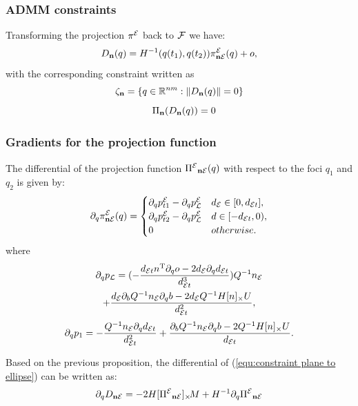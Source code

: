 \documentclass[journal]{IEEEtran}  %
\begin{document}
  \subsubsection{ADMM constraints}
  Transforming the projection $\pi^{\mathcal{E}}$ back to $\mathcal{F}$ we have:
  \begin{equation}\label{equ:constraint plane to ellipse}
    D_{\mathbf{n}}(q)= H^{-1}(q(t_1),q(t_2))\pi^{\mathcal{E}}_{\mathbf{n} \mathcal{E}}(q)+o,
  \end{equation}
  with the corresponding constraint written as
  \begin{equation}
    \zeta_{\mathbf{n}} = \{q\in\mathbb{R}^{nm}:\lVert D_{\mathbf{n}}(q)\rVert = 0 \}
  \end{equation}
  \begin{equation}
   \quad\Pi_{\mathbf{n}}(D_{\mathbf{n}}(q)) = {0}
  \end{equation}

  \subsubsection{Gradients for the projection function}
  \begin{proposition}\label{prop:dpi_ne dt}
    The differential of the projection function ${\Pi^{\mathcal{E}}}_{\mathbf{n} \mathcal{E}}(q)$ with respect to the foci $q_1$ and $q_2$ is given by:
    \begin{equation}
      \partial_q \pi^{\mathcal{E}}_{\mathbf{n} \mathcal{E}}(q) = \begin{cases}
        \partial_q p^{\mathcal{E}}_{t1}-\partial_q p^{\mathcal{E}}_{\mathcal{L}} &  d_{\mathcal{E}} \in [0, d_{\mathcal{E} t}], \\
        \partial_q p^{\mathcal{E}}_{t2}-\partial_q p^{\mathcal{E}}_{\mathcal{L}} &  d \in [- d_{\mathcal{E} t},0), \\
        {0} & otherwise.
      \end{cases}
    \end{equation}
    where
    \begin{multline}
      \partial_q p_{\mathcal{L}} =   (-\frac{d_{\mathcal{E} t} n^\mathrm{T} \partial_q o -2d_{\mathcal{E}} \partial_q d_{\mathcal{E} t}}{d_{\mathcal{E} t}^3} )Q^{-1}n_{\mathcal{E}} \\
      + \frac{d_{\mathcal{E}}\partial_b Q^{-1} n_{\mathcal{E}} \partial_q b -  2d_{\mathcal{E}} Q^{-1}H[n]_\times U}{d_{\mathcal{E} t}^2},
    \end{multline}
    \begin{equation}
      \partial_q p_{1} =  -\frac{Q^{-1}n_{\mathcal{E}} \partial_q d_{\mathcal{E} t} }{d_{\mathcal{E} t}^2} 
      + \frac{\partial_b Q^{-1}n_{\mathcal{E}} \partial_q b -  2Q^{-1}H[n]_\times U }{d_{\mathcal{E} t}}.
    \end{equation}
  \end{proposition}
  Based on the previous proposition, the differential of (\ref{equ:constraint plane to ellipse}) can be written as:
  \begin{equation}
    \partial_q {D_{\mathbf{n}\mathcal{E}}} = -2 H [{\Pi^{\mathcal{E}}}_{\mathbf{n} \mathcal{E}}]_{\times}\!  M + H^{-1}\partial_q {\Pi^{\mathcal{E}}}_{\mathbf{n} \mathcal{E}}
  \end{equation}
\end{document}
